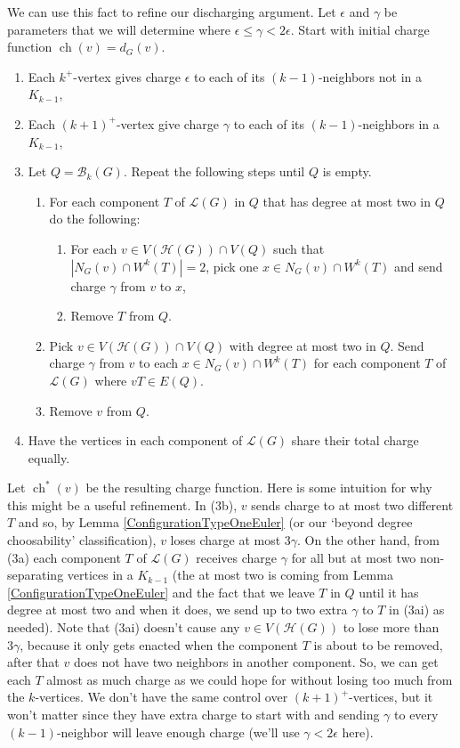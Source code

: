 \documentclass[12pt]{article}
\theoremstyle{plain}
\theoremstyle{definition}
\theoremstyle{remark}
\newcommand{\fancy}[1]{\mathcal{#1}}
\newcommand{\B}{\fancy{B}}
\renewcommand{\L}{\fancy{L}}
\newcommand{\HH}{\fancy{H}}
\newcommand{\card}[1]{\left|#1\right|}
\newcommand{\ch}{\operatorname{ch}}
\begin{document}
We can use this fact to refine our discharging argument.  Let $\epsilon$ and $\gamma$ be parameters that we will determine where $\epsilon \le \gamma < 2\epsilon$. Start with initial charge function $\ch(v) = d_G(v)$.  
\begin{enumerate}
	\item Each $k^+$-vertex gives charge $\epsilon$ to each of its $(k-1)$-neighbors not in a $K_{k-1}$,
	\item Each $(k+1)^+$-vertex give charge $\gamma$ to each of its $(k-1)$-neighbors in a $K_{k-1}$,
	\item Let $Q = \B_k(G)$.  Repeat the following steps until $Q$ is empty.
	  \begin{enumerate}
	  	\item For each component $T$ of $\L(G)$ in $Q$ that has degree at most two in $Q$ do the following:
	  	    \begin{enumerate}
	  	    	\item For each $v \in V(\HH(G)) \cap V(Q)$ such that $\card{N_G(v) \cap W^k(T)} = 2$, pick one $x \in N_G(v) \cap W^k(T)$ and send charge $\gamma$ from $v$ to $x$,
	  	    	\item Remove $T$ from $Q$.
	  	    \end{enumerate}
	  	\item Pick $v \in V(\HH(G)) \cap V(Q)$ with degree at most two in $Q$.  Send charge $\gamma$ from $v$ to each $x \in N_G(v) \cap W^k(T)$ for each component $T$ of $\L(G)$ where $vT \in E(Q)$.
	  	\item Remove $v$ from $Q$.
	  \end{enumerate}
	\item Have the vertices in each component of $\L(G)$ share their total charge equally.
\end{enumerate}
Let $\ch^*(v)$ be the resulting charge function.  Here is some intuition for why this might be a useful refinement.  In (3b), $v$ sends charge to at most two different $T$ and so, by Lemma \ref{ConfigurationTypeOneEuler} (or our `beyond degree choosability' classification), $v$ loses charge at most $3\gamma$.  On the other hand, from (3a) each component $T$ of $\L(G)$ receives charge $\gamma$ for all but at most two non-separating vertices in a $K_{k-1}$ (the at most two is coming from Lemma \ref{ConfigurationTypeOneEuler} and the fact that we leave $T$ in $Q$ until it has degree at most two and when it does, we send up to two extra $\gamma$ to $T$ in (3ai) as needed). Note that (3ai) doesn't cause any $v \in V(\HH(G))$ to lose more than $3\gamma$, because it only gets enacted when the component $T$ is about to be removed, after that $v$ does not have two neighbors in another component. So, we can get each $T$ almost as much charge as we could hope for without losing too much from the $k$-vertices.  We don't have the same control over $(k+1)^+$-vertices, but it won't matter since they have extra charge to start with and sending $\gamma$ to every $(k-1)$-neighbor will leave enough charge (we'll use $\gamma < 2\epsilon$ here).
\end{document}
